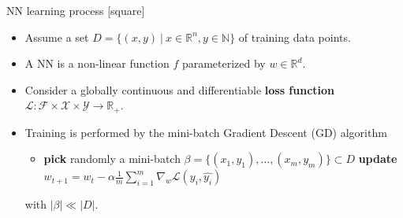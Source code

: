 \begin{frame}{NN learning process}
    [square]
    \begin{itemize}
        \item{Assume a set $D=\{(x,y)\:|\:x\in\mathbb{R}^n,y\in\mathbb{N}\}$ of training data points.}
        \vspace{0.3cm}
        \item{A NN is a non-linear function $f$ parameterized by $w\in\mathbb{R}^d$.}
        \vspace{0.3cm}
        \item{Consider a globally continuous and differentiable \textbf{loss function} $\mathcal{L}:\mathcal{F}\times\mathcal{X}\times\mathcal{Y}\rightarrow\mathbb{R}_+$.}
        \vspace{0.3cm}
        \item{Training is performed by the mini-batch Gradient Descent (GD) algorithm
        \begin{itemize}
            \item[]{
            \begin{algorithm}[H]
                \begin{algorithmic}[1]
                    \STATE \textbf{pick} randomly a mini-batch $\beta=\{(x_1,y_1),\dots,(x_m,y_m)\} \subset D$
                    \STATE \textbf{update} $w_{t+1}=w_t-\alpha\frac{1}{m}\sum_{i=1}^m\nabla_w\mathcal{L}(y_i,\hat{y_i})$
                    \ENDWHILE
                \end{algorithmic}
                \label{alg:gd}
            \end{algorithm}
            }
        \end{itemize}
        with $|\beta| \ll |D|$.}
    \end{itemize}
\end{frame}

